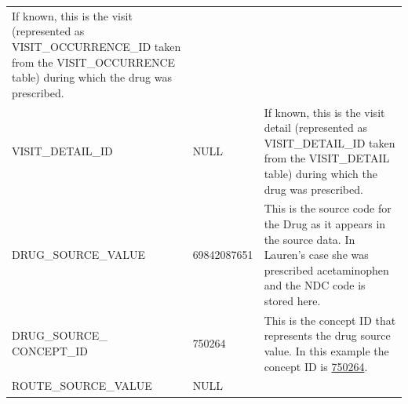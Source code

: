 \documentclass[11pt]{book}
\begin{document}
\begin{longtable}[]{@{}lll@{}}
\begin{minipage}[t]{0.47\columnwidth}
If known, this is the visit (represented as VISIT\_OCCURRENCE\_ID taken
from the VISIT\_OCCURRENCE table) during which the drug was
prescribed.\strut
\end{minipage}\tabularnewline
\begin{minipage}[t]{0.30\columnwidth}\raggedright\strut
VISIT\_DETAIL\_ID\strut
\end{minipage} & \begin{minipage}[t]{0.14\columnwidth}\raggedright\strut
NULL\strut
\end{minipage} & \begin{minipage}[t]{0.47\columnwidth}\raggedright\strut
If known, this is the visit detail (represented as VISIT\_DETAIL\_ID
taken from the VISIT\_DETAIL table) during which the drug was
prescribed.\strut
\end{minipage}\tabularnewline
\begin{minipage}[t]{0.30\columnwidth}\raggedright\strut
DRUG\_SOURCE\_VALUE\strut
\end{minipage} & \begin{minipage}[t]{0.14\columnwidth}\raggedright\strut
69842087651\strut
\end{minipage} & \begin{minipage}[t]{0.47\columnwidth}\raggedright\strut
This is the source code for the Drug as it appears in the source data.
In Lauren's case she was prescribed acetaminophen and the NDC code is
stored here.\strut
\end{minipage}\tabularnewline
\begin{minipage}[t]{0.30\columnwidth}\raggedright\strut
DRUG\_SOURCE\_ CONCEPT\_ID\strut
\end{minipage} & \begin{minipage}[t]{0.14\columnwidth}\raggedright\strut
750264\strut
\end{minipage} & \begin{minipage}[t]{0.47\columnwidth}\raggedright\strut
This is the concept ID that represents the drug source value. In this
example the concept ID is
\href{http://athena.ohdsi.org/search-terms/terms/750264}{750264}.\strut
\end{minipage}\tabularnewline
\begin{minipage}[t]{0.30\columnwidth}\raggedright\strut
ROUTE\_SOURCE\_VALUE\strut
\end{minipage} & \begin{minipage}[t]{0.14\columnwidth}\raggedright\strut
NULL\strut
\end{minipage} & \begin{minipage}[t]{0.47\columnwidth}\raggedright\strut

\end{minipage}
\end{longtable}
\end{document}
